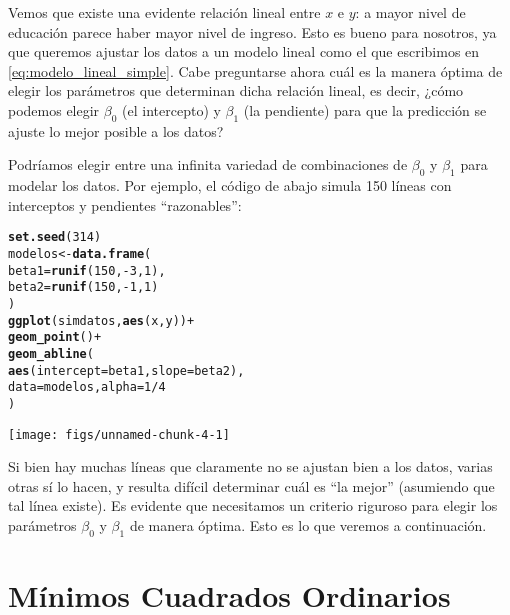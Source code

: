 \documentclass{report}\usepackage[]{graphicx}\usepackage[]{color}
\makeatletter
\newcommand{\hlnum}[1]{\textcolor[rgb]{0.686,0.059,0.569}{#1}}%
\newcommand{\hlopt}[1]{\textcolor[rgb]{0,0,0}{#1}}%
\newcommand{\hlstd}[1]{\textcolor[rgb]{0.345,0.345,0.345}{#1}}%
\newcommand{\hlkwb}[1]{\textcolor[rgb]{0.69,0.353,0.396}{#1}}%
\newcommand{\hlkwc}[1]{\textcolor[rgb]{0.333,0.667,0.333}{#1}}%
\newcommand{\hlkwd}[1]{\textcolor[rgb]{0.737,0.353,0.396}{\textbf{#1}}}%
\newenvironment{kframe}{%
 \def\at@end@of@kframe{}%
 \ifinner\ifhmode%
  \def\at@end@of@kframe{\end{minipage}}%
  \begin{minipage}{\columnwidth}%
 \fi\fi%
 \def\FrameCommand##1{\hskip\@totalleftmargin \hskip-\fboxsep
 \colorbox{shadecolor}{##1}\hskip-\fboxsep
     \hskip-\linewidth \hskip-\@totalleftmargin \hskip\columnwidth}%
 \MakeFramed {\advance\hsize-\width
   \@totalleftmargin\z@ \linewidth\hsize
   \@setminipage}}%
 {\par\unskip\endMakeFramed%
 \at@end@of@kframe}
\newenvironment{knitrout}{}{} %
\makeatother
\begin{document}
Vemos que existe una evidente relación lineal entre $x$ e $y$: a mayor nivel de educación parece haber mayor nivel de ingreso.
Esto es bueno para nosotros, ya que queremos ajustar los datos a un modelo lineal como el que escribimos en \eqref{eq:modelo_lineal_simple}.
Cabe preguntarse ahora cuál es la manera óptima de elegir los parámetros que determinan dicha relación lineal, es decir, ¿cómo podemos elegir $\beta_0$ (el intercepto) y $\beta_1$ (la pendiente) para que la predicción se ajuste lo mejor posible a los datos?

Podríamos elegir entre una infinita variedad de combinaciones de $\beta_0$ y $\beta_1$ para modelar los datos. Por ejemplo, el código de abajo simula 150 líneas con interceptos y pendientes ``razonables'':

\begin{knitrout}
\color{fgcolor}\begin{kframe}
\begin{alltt}
\hlkwd{set.seed}\hlstd{(}\hlnum{314}\hlstd{)}
\hlstd{modelos} \hlkwb{<-} \hlkwd{data.frame}\hlstd{(}
  \hlkwc{beta1} \hlstd{=} \hlkwd{runif}\hlstd{(}\hlnum{150}\hlstd{,} \hlopt{-}\hlnum{3}\hlstd{,} \hlnum{1}\hlstd{),}
  \hlkwc{beta2} \hlstd{=} \hlkwd{runif}\hlstd{(}\hlnum{150}\hlstd{,} \hlopt{-}\hlnum{1}\hlstd{,} \hlnum{1}\hlstd{)}
\hlstd{)}
\hlkwd{ggplot}\hlstd{(simdatos,} \hlkwd{aes}\hlstd{(x, y))} \hlopt{+}
  \hlkwd{geom_point}\hlstd{()} \hlopt{+}
  \hlkwd{geom_abline}\hlstd{(}
    \hlkwd{aes}\hlstd{(}\hlkwc{intercept} \hlstd{= beta1,} \hlkwc{slope} \hlstd{= beta2),}
    \hlkwc{data} \hlstd{= modelos,} \hlkwc{alpha} \hlstd{=} \hlnum{1}\hlopt{/}\hlnum{4}
  \hlstd{)}
\end{alltt}
\end{kframe}

{\centering \texttt{[image: figs/unnamed-chunk-4-1]} 

}



\end{knitrout}

Si bien hay muchas líneas que claramente no se ajustan bien a los datos, varias otras sí lo hacen, y resulta difícil determinar cuál es ``la mejor'' (asumiendo que tal línea existe).
Es evidente que necesitamos un criterio riguroso para elegir los parámetros $\beta_0$ y $\beta_1$ de manera óptima.
Esto es lo que veremos a continuación.


\section{Mínimos Cuadrados Ordinarios}
\label{sec:MCO}
\end{document}
